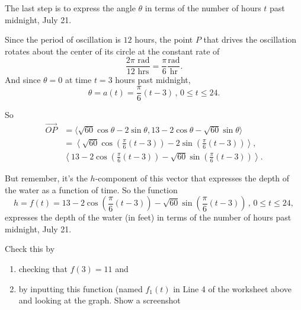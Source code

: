 \documentclass{ximera}
\begin{document}
\begin{question}
\begin{explanation}
The last step is to express the angle $\theta$ in terms of the number of hours $t$ past midnight, July 21.

Since the period of oscillation is $12$ hours, the point $P$ that drives the oscillation rotates about the center of its circle at the constant rate of
\[
      \frac{2\pi \text{ rad}}{12\text{ hrs}} = \frac{\pi}{6} \frac{\text{rad}}{\text{hr}} .
\]
And since $\theta=0$ at time $t=3$ hours past midnight,
\[
  \theta = a(t) = \frac{\pi}{6} \left(t-3\right) \, , \, 0\leq t \leq 24.
\]

So
\begin{align*}
    \overrightarrow{OP} & = \langle \sqrt{60}\cos\theta - 2 \sin \theta,  13-2\cos\theta -\sqrt{60}\sin \theta \rangle \\
                                  & = \left \langle \sqrt{60}\cos\left(  \frac{\pi}{6} \left(t-3\right)\right) - 2 \sin \left(  \frac{\pi}{6} \left(t-3\right)\right) \right\rangle,  \\
                                  &\left\langle 13-2\cos\left(  \frac{\pi}{6} \left(t-3\right)\right) -\sqrt{60}\sin \left(  \frac{\pi}{6} \left(t-3\right)\right) \right\rangle .
\end{align*}

But remember, it's the $h$-component of this vector that expresses the depth of the water as a function of time. So the function 
\[
   h = f(t) = 13-2\cos\left(  \frac{\pi}{6} \left(t-3\right)\right) -\sqrt{60}\sin \left(  \frac{\pi}{6} \left(t-3\right)\right) \, , \, 0\leq t \leq  24,
\]
expresses the depth of the water (in feet) in terms of the number of hours past midnight, July 21.

Check this by 
\begin{enumerate}

\item checking that $f(3) = 11$ and

\item by inputting this function (named $f_1(t)$ in Line 4 of the worksheet above and looking at the graph. Show a screenshot

\begin{freeResponse}
\end{freeResponse}

\end{enumerate}
\end{explanation}
\end{question}
\end{document}
